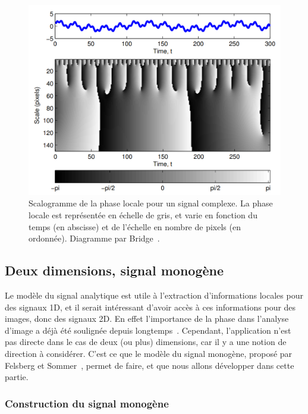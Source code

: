 \begin{figure}
    \centering
    \includegraphics[width=\textwidth]{contenu/resources/images/scalogram}
    \caption[Scalogramme de la phase locale]{Scalogramme de la phase locale pour un signal complexe. La phase locale est représentée en échelle de gris, et varie en fonction du temps (en abscisse) et de l'échelle en nombre de pixels (en ordonnée). Diagramme par Bridge~\cite{bridge_introduction_2018}.}
    \label{fig:scalogram}
\end{figure}


\subsection{Deux dimensions, signal monogène}

Le modèle du signal analytique est utile à l'extraction d'informations locales pour des signaux 1D, et il serait intéressant d'avoir accès à ces informations pour des images, donc des signaux 2D. En effet l'importance de la phase dans l'analyse d'image a déjà été soulignée depuis longtemps~\cite{oppenheim_importance_1981}. Cependant, l'application n'est pas directe dans le cas de deux (ou plus) dimensions, car il y a une notion de direction à considérer. C'est ce que le modèle du signal monogène, proposé par Felsberg et Sommer~\cite{felsberg_monogenic_2001}, permet de faire, et que nous allons développer dans cette partie.

\subsubsection{Construction du signal monogène}

